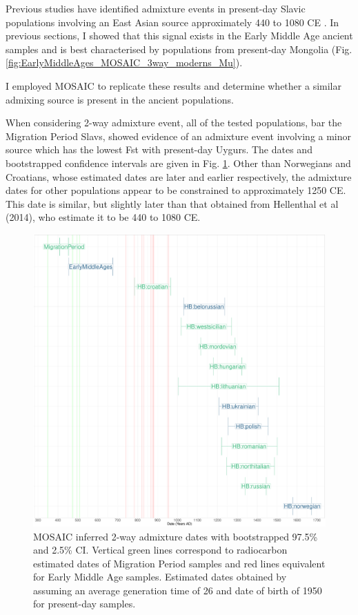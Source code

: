 Previous studies have identified admixture events in present-day Slavic populations involving an East Asian source approximately 440 to 1080 CE \cite{Hellenthal2016, MOSAIC_2019}. In previous sections, I showed that this signal exists in the Early Middle Age ancient samples and is best characterised by populations from present-day Mongolia (Fig. \ref{fig:EarlyMiddleAges_MOSAIC_3way_moderns_Mu}). 

I employed MOSAIC \cite{MOSAIC_2019} to replicate these results and determine whether a similar admixing source is present in the ancient populations. 

When considering 2-way admixture event, all of the tested populations, bar the Migration Period Slavs, showed evidence of an admixture event involving a minor source which has the lowest Fst with present-day Uygurs. The dates and bootstrapped confidence intervals are given in Fig. \ref{fig:MOSAIC_admixture_dates_plot}. Other than Norwegians and Croatians, whose estimated dates are later and earlier respectively, the admixture dates for other populations appear to be constrained to approximately 1250 CE. This date is similar, but slightly later than that obtained from Hellenthal et al (2014), who estimate it to be 440 to 1080 CE.

\begin{figure}[htp]
    \centering
    \includegraphics[width=1.0\textwidth]{../images/chapter5/MOSAIC_admixture_dates_plot.pdf}
    \caption{MOSAIC inferred 2-way admixture dates with bootstrapped 97.5\% and 2.5\% CI. Vertical green lines correspond to radiocarbon estimated dates of Migration Period samples and red lines equivalent for Early Middle Age samples. Estimated dates obtained by assuming an average generation time of 26 and date of birth of 1950 for present-day samples.}
    \label{fig:MOSAIC_admixture_dates_plot}
\end{figure} 

